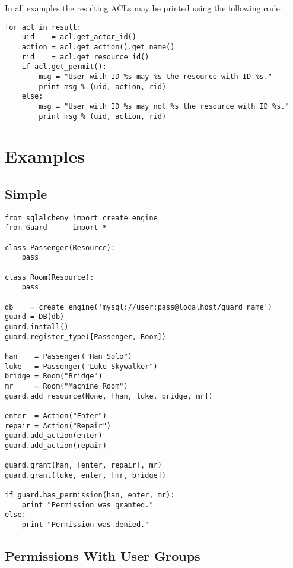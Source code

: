 In all examples the resulting ACLs may be printed using the following code:

\begin{lstlisting}
for acl in result:
    uid    = acl.get_actor_id()
    action = acl.get_action().get_name()
    rid    = acl.get_resource_id()
    if acl.get_permit():
        msg = "User with ID %s may %s the resource with ID %s."
        print msg % (uid, action, rid)
    else:
        msg = "User with ID %s may not %s the resource with ID %s."
        print msg % (uid, action, rid)
\end{lstlisting}


\newpage
\section{Examples}
\subsection{Simple}

\begin{lstlisting}
from sqlalchemy import create_engine
from Guard      import *

class Passenger(Resource):
    pass

class Room(Resource):
    pass

db    = create_engine('mysql://user:pass@localhost/guard_name')
guard = DB(db)
guard.install()
guard.register_type([Passenger, Room])

han    = Passenger("Han Solo")
luke   = Passenger("Luke Skywalker")
bridge = Room("Bridge")
mr     = Room("Machine Room")
guard.add_resource(None, [han, luke, bridge, mr])

enter  = Action("Enter")
repair = Action("Repair")
guard.add_action(enter)
guard.add_action(repair)

guard.grant(han, [enter, repair], mr)
guard.grant(luke, enter, [mr, bridge])

if guard.has_permission(han, enter, mr):
    print "Permission was granted."
else:
    print "Permission was denied."
\end{lstlisting}


\subsection{Permissions With User Groups}

